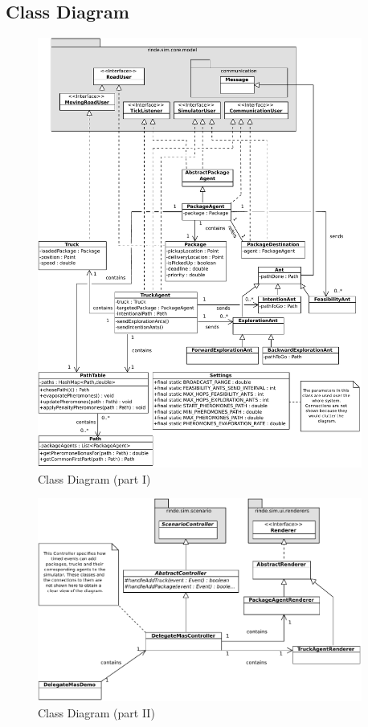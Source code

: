 \subsection{Class Diagram}
\vfill
\begin{figure}[!h]
        \vspace{0.5pt}
        \begin{center}
                \includegraphics[width = 0.95\textwidth]{./diagrams/ClassDiagram.pdf}
		\end{center}
		\caption{Class Diagram (part I)}
		\label{Fig:ClassDiagram1}
        \vspace{0.5pt}
\end{figure}

\vfill
\newpage

\begin{figure}[!h]
        \vspace{0.5pt}
        \begin{center}
                \includegraphics[width = 0.95\textwidth]{./diagrams/ClassDiagram2.pdf}
		\end{center}
		\caption{Class Diagram (part II)}
		\label{Fig:ClassDiagram2}
        \vspace{0.5pt}
\end{figure}